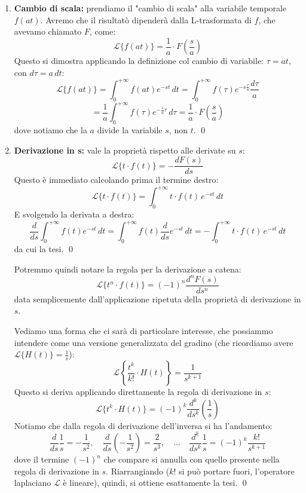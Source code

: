 \documentclass[a4paper,11pt]{article}
\begin{document}
\begin{enumerate}
	\item \textbf{Cambio di scala:} prendiamo il "cambio di scala" alla variabile temporale $f(at)$. Avremo che il risultatò dipenderà dalla L-trasformata di $f$, che avevamo chiamato $F$, come:
		$$
			\mathcal{L}\{f(at)\} = \frac{1}{a} \cdot F\left(\frac{s}{a}\right) 
		$$
		Questo si dimostra applicando la definizione col cambio di variabile: $\tau = at$, con $d\tau = a \, dt$:
		$$
		\mathcal{L}\{f(at) \} = \int_0^{+ \infty} f(at) e^{-st} \, dt = \int_0^{+ \infty} f(\tau) e^{-s \frac{\tau}{a}} \frac{d\tau}{a}
		$$
		$$
		= \frac{1}{a} \int_0^{+ \infty} f(\tau) e^{-\frac{s}{a} \tau} \, d\tau = \frac{1}{a} \cdot F\left( \frac{s}{a} \right)
		$$
		dove notiamo che la $a$ divide la variabile $s$, non $t$. \qed
	\item \textbf{Derivazione in s:} vale la proprietà rispetto alle derivate su $s$:
		$$
			\mathcal{L}\{t \cdot f(t)\} = - \frac{d F(s)}{ds}
		$$
		Questo è immediato calcolando prima il termine destro:
		$$
			\mathcal{L}\{t \cdot f(t)\} = \int_0^{+\infty} t \cdot f(t) \, e^{-st} \, dt
		$$
		E svolgendo la derivata a destra:
		$$
			\frac{d}{ds} \int_0^{+\infty} f(t) e^{-st} \, dt = \int_0^{+\infty} f(t) \frac{d}{ds}e^{-st} \, dt = -\int_0^{+\infty} t \cdot f(t) \, e^{-st} \, dt
		$$ 
		da cui la tesi. \qed

		Potremmo quindi notare la regola per la derivazione a catena:
		$$
			\mathcal{L}\{t^n \cdot f(t)\} = (-1)^n \frac{d^n F(s)}{ds^n}
		$$
		data semplicemente dall'applicazione ripetuta della proprietà di derivazione in $s$.
		
		Vediamo una forma che ci sarà di particolare interesse, che possiammo intendere come una versione generalizzata del gradino (che ricordiamo avere $\mathcal{L}\{H(t)\} = \frac{1}{s}$):
		$$
		\mathcal{L}\left\{ \frac{t^k}{k!} \cdot H(t) \right\} = \frac{1}{s^{k + 1}}
		$$
		Questo si deriva applicando direttamente la regola di derivazione in $s$:
		$$
		\mathcal{L} \{ t^k \cdot H(t) \} = (-1)^k \frac{d^k}{ds^k} \left( \frac{1}{s} \right)
		$$
		Notiamo che dalla regola di derivazione dell'inversa si ha l'andamento:
		$$
		\frac{d}{ds} \frac{1}{s} = - \frac{1}{s^2}, \quad \frac{d}{ds} \left( -\frac{1}{s^2} \right) = \frac{2}{s^3}, \quad ... \quad \frac{d^k}{ds^k} \frac{1}{s} = (-1)^k \frac{k!}{s^{k + 1}} 
		$$
		dove il termine $(-1)^n$ che compare si annulla con quello presente nella regola di derivazione in $s$.
		Riarrangiando ($k!$ si può portare fuori, l'operatore laplaciano $\mathcal{L}$ è lineare), quindi, si ottiene esattamente la tesi. \qed
		

\end{enumerate}
\end{document}
